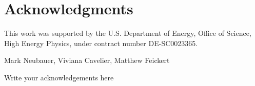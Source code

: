 \chapter*{Acknowledgments}
This work was supported by the U.S. Department of Energy, Office of Science, High Energy Physics, under contract number DE-SC0023365.

Mark Neubauer, Viviana Cavelier, Matthew Feickert

Write your acknowledgements here
